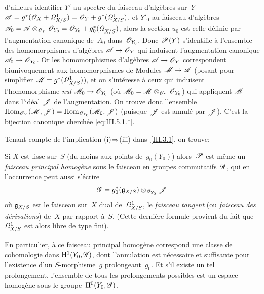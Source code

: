d'ailleurs identifier $Y'$ au spectre du faisceau d'alg\`ebres sur~$Y$ $\cal{A}=g^*(\cal{O}_X+\it{\Omega}^1_{X/S})=\cal{O}_Y+
g^*(\it{\Omega}^1_{X/S})$, et $Y'_0$ au faisceau d'alg\`ebres
$\cal{A}_0=\cal{A}\otimes_{\cal{O}_Y}\cal{O}_{Y_0}=\cal{O}_{Y_0}+
g^*_0(\it{\Omega}^1_{X/S})$, alors la section $u_0$ est celle
d\'efinie par l'augmentation canonique de~$A_0$
dans~$\cal{O}_{Y_0}$. Donc $\cal{P}(Y)$ s'identifie \`a l'ensemble
des homomorphismes d'alg\`ebres $\cal{A}\to \cal{O}_Y$ qui induisent
l'augmentation canonique $\cal{A}_0\to \cal{O}_{Y_0}$. Or les
homomorphismes d'alg\`ebres $\cal{A}\to \cal{O}_Y$
correspondent
biunivoquement aux homomorphismes de Modules $\cal{M}\to \cal{A}$
(posant pour simplifier $\cal{M}=g^*(\it{\Omega}^1_{X/S})$), et on
s'int\'eresse \`a ceux qui induisent l'homomorphisme {\emph{nul}}
$\cal{M}_0\to \cal{O}_{Y_0}$ (o\`u
$\cal{M}_0=\cal{M}\otimes_{\cal{O}_Y}\cal{O}_{Y_0}$) \ie qui
appliquent $\cal{M}$ dans l'id\'eal $\cal{J}$ de l'augmentation. On
trouve donc l'ensemble
$\Hom_{\cal{O}_Y}(\cal{M},\cal{J})=\Hom_{\cal{O}_{Y_0}}(\cal{M}_0,\cal{J})$
(puisque $\cal{J}$ est annul\'e par $\cal{J}$). C'est la bijection
canonique cherch\'ee \eqref{eq:III.5.1.*}.

Tenant compte de l'implication (i)$\To$(iii)
dans~\ref{III.3.1}, on trouve:

\begin{corollaire}
\label{III.5.2}
Si $X$ est lisse sur~$S$ (du moins aux points de~$g_0(Y_0)$)
alors~$\cal{P}$ est m\^eme un \emph{faisceau principal homogène}
sous le faisceau en groupes commutatifs~$\cal{G}$, qui en l'occurrence
peut aussi s'\'ecrire
\begin{equation*}
\cal{G}=g_0^*(\goth{g}_{X/S})\otimes_{\cal{O}_{Y_0}}\cal{J}
\end{equation*}
o\`u $\goth{g}_{X/S}$
\label{indnot:cb}est le faisceau sur~$X$ dual de~$\it{\Omega}_{X/S}^1$, \ie le
\emph{faisceau tangent}
(ou \emph{faisceau des dérivations})
de~$X$ par rapport \`a~$S$. (Cette derni\`ere formule provient du
fait que~$\it{\Omega}_{X/S}^1$ est alors libre de type fini).
\end{corollaire}

En particulier, \`a ce faisceau principal homog\`ene correspond
une classe de cohomologie dans $\H^1(Y_0,\cal{G})$, dont l'annulation
est n\'ecessaire et suffisante pour l'existence d'un
$S$-morphisme~$g$ prolongeant~$g_0$. Et s'il existe un tel
prolongement, l'ensemble de tous les prolongements possibles est un
espace homog\`ene sous le groupe~$\H^0(Y_0,\cal{G})$.

